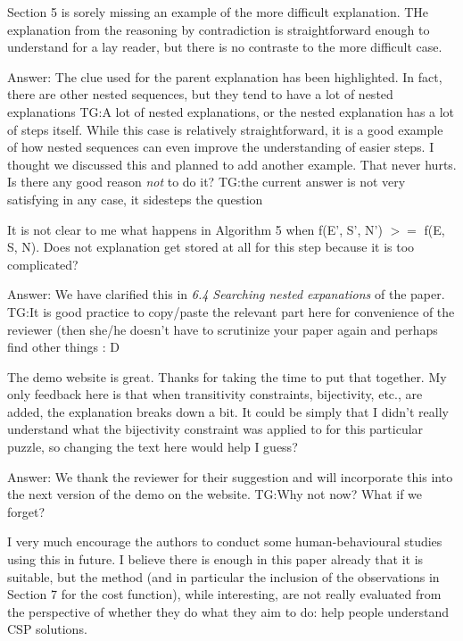 \documentclass{article}
\newcommand\comment[1]{\marginpar{\tiny #1}}
\renewcommand\comment[1]{#1}
\newcommand{\tias}[1]{{\comment{\color{blue}\textsc{TG:}#1}}}
\newcommand{\emilio}[1]{{\comment{Answer: \color{red}#1}}}
\newcommand{\bart}[1]{{\comment{\color{green}#1}}}
\begin{document}
\begin{quoteit}
Section 5 is sorely missing an example of the more difficult explanation. THe explanation from the reasoning by contradiction is straightforward enough to understand for a lay reader, but there is no contraste to the more difficult case.
\end{quoteit}

\emilio{The clue used for the parent explanation has been highlighted. In fact, there are other nested sequences, but they tend to have a lot of nested explanations \tias{A lot of nested explanations, or the nested explanation has a lot of steps itself}. While this case is relatively straightforward, it is a good example of how nested sequences can even improve the understanding of easier steps.}
\bart{I thought we discussed this and planned to add another example. That never hurts. Is there any good reason \emph{not} to do it?}
\tias{the current answer is not very satisfying in any case, it sidesteps the question}

\begin{quoteit}
It is not clear to me what happens in Algorithm 5 when f(E', S', N') $>=$ f(E, S, N). Does not explanation get stored at all for this step because it is too complicated? 
\end{quoteit}

\emilio{We have clarified this in \emph{6.4 Searching nested expanations} of the paper.} \tias{It is good practice to copy/paste the relevant part here for convenience of the reviewer (then she/he doesn't have to scrutinize your paper again and perhaps find other things : D}

\begin{quoteit}
The demo website is great. Thanks for taking the time to put that together. My only feedback here is that when transitivity constraints, bijectivity, etc., are added, the explanation breaks down a bit. It could be simply that I didn't really  understand what the bijectivity constraint was applied to for this particular puzzle, so changing the text here would help I guess?
\end{quoteit}

\emilio{We thank the reviewer for their suggestion and will incorporate this into the next version of the demo on the website.} \tias{Why not now? What if we forget?}

\begin{quoteit}
I very much encourage the authors to conduct some human-behavioural studies using this in future. I believe there is enough in this paper already that it is suitable, but the method (and in particular the inclusion of the observations in Section 7 for the cost function), while interesting, are not really evaluated from the perspective of whether they do what they aim to do: help people understand CSP solutions. 
\end{quoteit}
\end{document}
